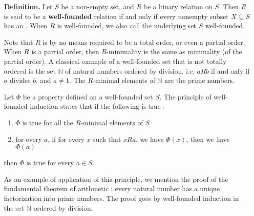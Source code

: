 \documentclass[12pt]{article}
\newcommand{\Nat}{\mathbb{N}}
\begin{document}

{\bf Definition.} Let $S$ be a non-empty set, and $R$ be a binary relation on $S$.  Then $R$ is said to be a {\bf well-founded} relation if and only if every nonempty subset $X\subseteq S$ has an .  When $R$ is well-founded, we also call the underlying set $S$ well-founded.

Note that $R$ is by no means required to be a total order, or even a partial order.  When $R$ is a partial order, then $R$-minimality is the same as minimality (of the partial order).  A classical example of a well-founded set that is not totally ordered is the set $\Nat$ of natural numbers ordered by division, i.e. $aRb$ if and only if $a$ divides $b$, and $a\not=1$.  The $R$-minimal elements of $\Nat$ are the prime numbers.

Let $\Phi$ be a property defined on a well-founded set $S$.  The principle of well-founded induction states that if the following is true :
\begin{enumerate}
\item $\Phi$ is true for all the $R$-minimal elements of $S$
\item for every $a$, if for every $x$ such that $xRa$, we have $\Phi(x)$, then we have $\Phi(a)$
\end{enumerate}
then $\Phi$ is true for every $a\in S$.

As an example of application of this principle, we mention the proof of the fundamental theorem of arithmetic : every natural number has a unique factorization into prime numbers.  The proof goes by well-founded induction in the set $\Nat$ ordered by division.
\end{document}
